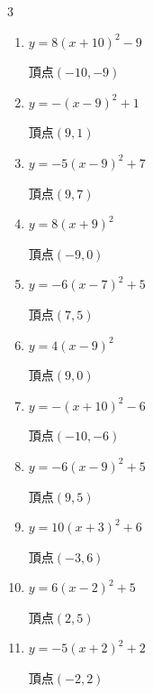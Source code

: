 \begin{multicols}{3}
\begin{enumerate}
        $\displaystyle 頂点\left( -8 , 2 \right)$

  \item $\displaystyle y=8\left( x+10\right)^{2}-9$

        $\displaystyle 頂点\left( -10 , -9 \right)$

  \item $\displaystyle y=-\left( x-9\right)^{2}+1$

        $\displaystyle 頂点\left( 9 , 1 \right)$

  \item $\displaystyle y=-5\left( x-9\right)^{2}+7$

        $\displaystyle 頂点\left( 9 , 7 \right)$

  \item $\displaystyle y=8\left( x+9\right)^{2}$

        $\displaystyle 頂点\left( -9 , 0 \right)$

  \item $\displaystyle y=-6\left( x-7\right)^{2}+5$

        $\displaystyle 頂点\left( 7 , 5 \right)$

  \item $\displaystyle y=4\left( x-9\right)^{2}$

        $\displaystyle 頂点\left( 9 , 0 \right)$

  \item $\displaystyle y=-\left( x+10\right)^{2}-6$

        $\displaystyle 頂点\left( -10 , -6 \right)$

  \item $\displaystyle y=-6\left( x-9\right)^{2}+5$

        $\displaystyle 頂点\left( 9 , 5 \right)$

  \item $\displaystyle y=10\left( x+3\right)^{2}+6$

        $\displaystyle 頂点\left( -3 , 6 \right)$

\columnbreak %

\resetques

  \item $\displaystyle y=6\left( x-2\right)^{2}+5$

        $\displaystyle 頂点\left( 2 , 5 \right)$

  \item $\displaystyle y=-5\left( x+2\right)^{2}+2$

        $\displaystyle 頂点\left( -2 , 2 \right)$


\end{enumerate}
\end{multicols}
